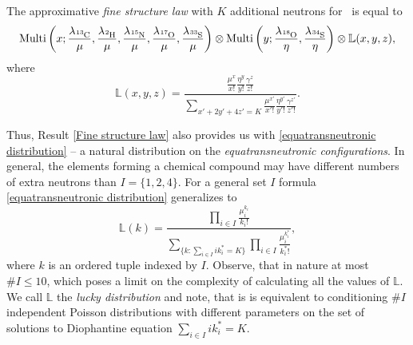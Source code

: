 \begin{result}\label{Fine structure law}
	The approximative \emph{fine structure law} with $K$ additional neutrons for \molecule\, is equal to 
	\begin{equation*}
	\mathrm{Multi} \left(
		x;
		\frac{ \lambda_\cem{^{13}C} }{ \mu }, 
		\frac{ \lambda_\cem{^{2} H} }{ \mu }, 
		\frac{ \lambda_\cem{^{15}N} }{ \mu },
		\frac{ \lambda_\cem{^{17}O} }{ \mu }, 
		\frac{ \lambda_\cem{^{33}S} }{  \mu} 
	\right ) \otimes
	\mathrm{Multi} \left(
		y;	
		\frac{ \lambda_\cem{^{18}O} }{ \eta },
		\frac{ \lambda_\cem{^{34}S} }{ \eta } 
	\right) \otimes 
	\mathbb{L}( x, y, z ),
\end{equation*}
	where 
	\begin{equation}\label{equatransneutronic distribution}
		\mathbb{L}( x, y , z) = 
		\frac{ \frac{ \mu^x }{ x! } \frac{ \eta^y}{ y! } \frac{ \gamma^z}{z!} }{ 
			\underset{ x' + 2 y' + 4 z' = K}{\sum} 
				\frac{ \mu^{x'} }{ x'! } 
				\frac{ \eta^{y'}}{ y'! } 
				\frac{ \gamma^{z'}}{z'!}
		}.
	\end{equation}
\end{result}
Thus, Result \ref{Fine structure law} also provides us with \eqref{equatransneutronic distribution} -- a natural distribution on the {\it equatransneutronic configurations}. In general, the elements forming a chemical compound may have different numbers of extra neutrons than $I = \{ 1, 2, 4\}$. For a general set $I$ formula \eqref{equatransneutronic distribution} generalizes to 
\begin{equation*}
	\mathbb{L}( k ) = 
	\frac{ 
		\prod_{i \in I} \frac{ \mu_i^{k_i} }{ {k_i}! } 
	}{ 
		\underset{ \{ k :  \sum_{i \in I} i k_i^*  = K \} }{\sum} 	
		\prod_{i \in I} \frac{ \mu_i^{k_i^*} }{ {k_i^*}! }	
	},
\end{equation*}
where $k$ is an ordered tuple indexed by $I$. Observe, that in nature at most $\# I \leq 10$, which poses a limit on the complexity of calculating all the values of $\mathbb{L}$. We call $\mathbb{L}$ the {\it lucky distribution} and note, that is is equivalent to conditioning $\#I$ independent Poisson distributions with different parameters on the set of solutions to Diophantine equation $\sum_{i \in I} i k_i^*  = K$.